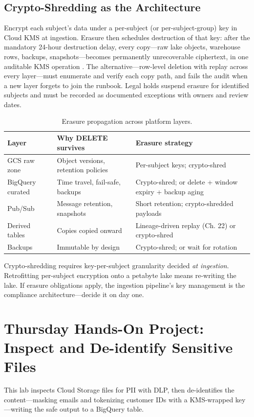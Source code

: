 \subsection{Crypto-Shredding as the Architecture}
Encrypt each subject's data under a per-subject (or per-subject-group) key in Cloud KMS at ingestion. Erasure then schedules destruction of that key: after the mandatory 24-hour destruction delay, every copy---raw lake objects, warehouse rows, backups, snapshots---becomes permanently unrecoverable ciphertext, in one auditable KMS operation \cite{googlecloudkmsdocs}. The alternative---row-level deletion with replay across every layer---must enumerate and verify each copy path, and fails the audit when a new layer forgets to join the runbook. Legal holds suspend erasure for identified subjects and must be recorded as documented exceptions with owners and review dates.

\begin{table}[H]
\centering
\small
\begin{tabular}{@{}p{3.4cm}p{4.6cm}p{4.6cm}@{}} \\
\toprule
\textbf{Layer} & \textbf{Why DELETE survives} & \textbf{Erasure strategy} \\
\midrule
GCS raw zone & Object versions, retention policies & Per-subject keys; crypto-shred \\
BigQuery curated & Time travel, fail-safe, backups & Crypto-shred; or delete + window expiry + backup aging \\
Pub/Sub & Message retention, snapshots & Short retention; crypto-shredded payloads \\
Derived tables & Copies copied onward & Lineage-driven replay (Ch. 22) or crypto-shred \\
Backups & Immutable by design & Crypto-shred; or wait for rotation \\
\bottomrule
\end{tabular}
\caption{Erasure propagation across platform layers.}
\label{tab:ch23-erasure-layers}
\end{table}

\begin{pitfall}
Crypto-shredding requires key-per-subject granularity decided \emph{at ingestion}. Retrofitting per-subject encryption onto a petabyte lake means re-writing the lake. If erasure obligations apply, the ingestion pipeline's key management is the compliance architecture---decide it on day one.
\end{pitfall}

\section{Thursday Hands-On Project: Inspect and De-identify Sensitive Files}
This lab inspects Cloud Storage files for PII with DLP, then de-identifies the content---masking emails and tokenizing customer IDs with a KMS-wrapped key---writing the safe output to a BigQuery table.

